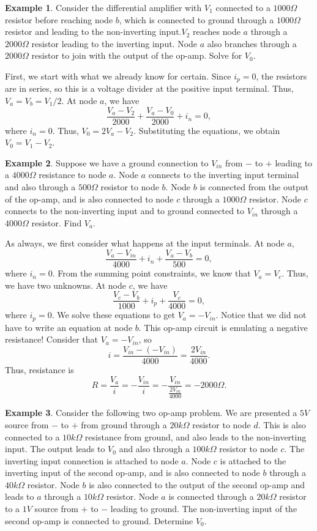 \documentclass[11pt]{article}
\theoremstyle{plain} %
\theoremstyle{definition}
\theoremstyle{example}
\newtheorem*{example}{Example}
\theoremstyle{remark}
\begin{document}
\begin{example}
Consider the differential amplifier with $V_1$ connected to a $1000\Omega$ resistor before reaching node $b$, which is connected to ground through a $1000\Omega$ resistor and leading to the non-inverting input.$V_2$ reaches node $a$ through a $2000\Omega$ resistor leading to the inverting input. Node $a$ also branches through a $2000\Omega$ resistor to join with the output of the op-amp. Solve for $V_0$.
\end{example}

First, we start with what we already know for certain. Since $i_p=0$, the resistors are in series, so this is a voltage divider at the positive input terminal. Thus, $V_a = V_b = V_1/2$. At node $a$, we have 
$$\frac{V_a-V_2}{2000} + \frac{V_a-V_0}{2000} + i_n = 0,$$
where $i_n = 0$. Thus, $V_0 = 2V_a-V_2$. Substituting the equations, we obtain 
$V_0 = V_1-V_2$.

\begin{example}
Suppose we have a ground connection to $V_{in}$ from $-$ to $+$ leading to a $4000\Omega$ resistance to node $a$. Node $a$ connects to the inverting input terminal and also through a $500\Omega$ resistor to node $b$. Node $b$ is connected from the output of the op-amp, and is also connected to node $c$ through a $1000\Omega$ resistor. Node $c$ connects to the non-inverting input and to ground connected to $V_{in}$ through a $4000\Omega$ resistor. Find $V_a$. 
\end{example}

As always, we first consider what happens at the input terminals. At node $a$, 
$$\frac{V_a-V_{in}}{4000} + i_n + \frac{V_a-V_b}{500} = 0,$$
where $i_n=0$. From the summing point constraints, we know that $V_a = V_c$. Thus, we have two unknowns. At node $c$, we have
$$\frac{V_c-V_b}{1000} + i_p + \frac{V_c}{4000} = 0,$$
where $i_p=0$. We solve these equations to get $V_a = -V_{in}$. Notice that we did not have to write an equation at node $b$. This op-amp circuit is emulating a negative resistance! Consider that $V_a = -V_{in}$, so 
$$i = \frac{V_{in} - (-V_{in})}{4000} = \frac{2V_{in}}{4000}.$$ Thus, resistance is 
$$R = \frac{V_a}{i} = -\frac{V_{in}}{i} = -\frac{V_{in}}{\frac{2V_{in}}{4000}} = -2000\Omega.$$

\begin{example}
Consider the following two op-amp problem. We are presented a $5V$ source from $-$ to $+$ from ground through a $20k\Omega$ resistor to node $d$. This is also connected to a $10k\Omega$ resistance from ground, and also leads to the non-inverting input. The output leads to $V_0$ and also through a $100k\Omega$ resistor to node $c$. The inverting input connection is attached to node $a$. Node $c$ is attached to the inverting input of the second op-amp, and is also connected to node $b$ through a $40k\Omega$ resistor. Node $b$ is also connected to the output of the second op-amp and leads to $a$ through a $10k\Omega$ resistor. Node $a$ is connected through a $20k\Omega$ resistor to a $1V$ source from $+$ to $-$ leading to ground. The non-inverting input of the second op-amp is connected to ground. Determine $V_0$. 
\end{example}
\end{document}
